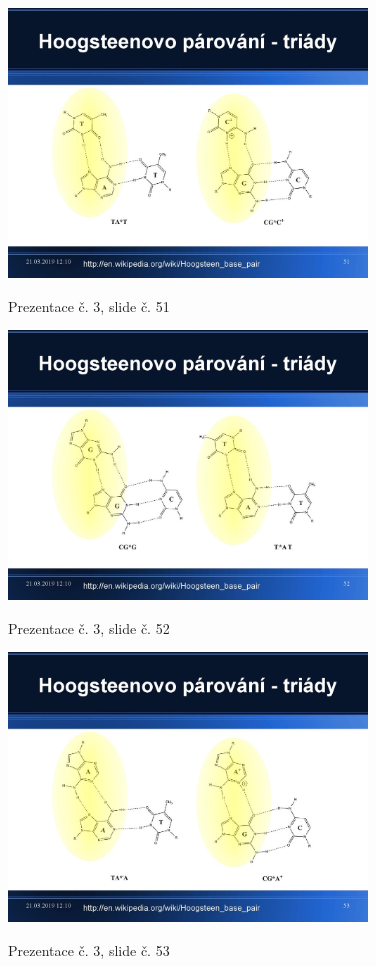 \documentclass[DIV=8]{scrreprt}
\begin{document}
\begin{figure}
    \caption{Prezentace č. 3, slide č. 51}
    \includegraphics[width=0.85\textwidth]{slides-3/slide-51.jpg}
    \centering
    \label{slides-3-slide-51}
\end{figure}
\begin{figure}
    \caption{Prezentace č. 3, slide č. 52}
    \includegraphics[width=0.85\textwidth]{slides-3/slide-52.jpg}
    \centering
    \label{slides-3-slide-52}
\end{figure}
\begin{figure}
    \caption{Prezentace č. 3, slide č. 53}
    \includegraphics[width=0.85\textwidth]{slides-3/slide-53.jpg}
    \centering
    \label{slides-3-slide-53}
\end{figure}
\end{document}
